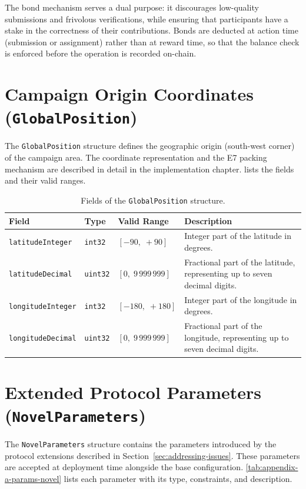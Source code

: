The bond mechanism serves a dual purpose: it discourages low-quality submissions and frivolous verifications, while ensuring that participants have a stake in the correctness of their contributions.
Bonds are deducted at action time (submission or assignment) rather than at reward time, so that the balance check is enforced before the operation is recorded on-chain.


\section{Campaign Origin Coordinates (\texttt{GlobalPosition})}\label{sec:appendix-a-origin-coordinated}

The \texttt{GlobalPosition} structure defines the geographic origin (south-west corner) of the campaign area.
The coordinate representation and the E7 packing mechanism are described in detail in the implementation chapter.  lists the fields and their valid ranges.

\begin{table}
    \begin{tabular}{p{3.8cm} l p{2.8cm} p{4.8cm}}
        \hline
        \textbf{Field} & \textbf{Type} & \textbf{Valid Range} & \textbf{Description} \\
        \hline
        \texttt{latitudeInteger}
        & \texttt{int32}
        & $[-90,\; +90]$
        & Integer part of the latitude in degrees. \\[6pt]

        \texttt{latitudeDecimal}
        & \texttt{uint32}
        & $[0,\; 9\,999\,999]$
        & Fractional part of the latitude, representing up to seven decimal digits. \\[6pt]

        \texttt{longitudeInteger}
        & \texttt{int32}
        & $[-180,\; +180]$
        & Integer part of the longitude in degrees. \\[6pt]

        \texttt{longitudeDecimal}
        & \texttt{uint32}
        & $[0,\; 9\,999\,999]$
        & Fractional part of the longitude, representing up to seven decimal digits. \\
        \hline
    \end{tabular}
    \caption{Fields of the \texttt{GlobalPosition} structure.}
    \label{tab:params-position}
\end{table}


\section{Extended Protocol Parameters (\texttt{NovelParameters})}\label{sec:appendix-a-novel-parameters}
The \texttt{NovelParameters} structure contains the parameters introduced by the protocol extensions described in Section~\ref{sec:addressing-issues}.
These parameters are accepted at deployment time alongside the base configuration.
\ref{tab:appendix-a-params-novel} lists each parameter with its type, constraints, and description.

